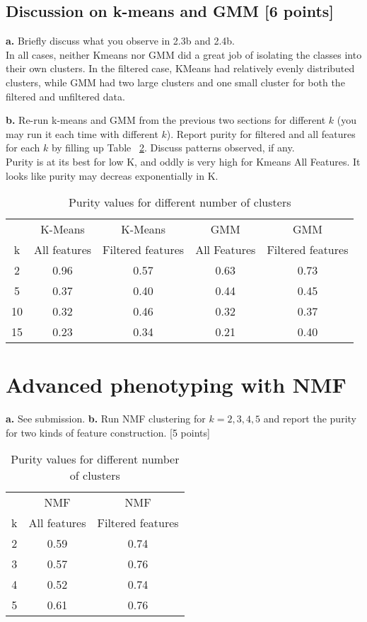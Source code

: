 \documentclass[12pt]{article}
\begin{document}
\subsection{Discussion on k-means and GMM [6 points]}
\textbf{a.} Briefly discuss what you observe in 2.3b and 2.4b.\\

In all cases, neither Kmeans nor GMM did a great job of isolating the classes
into their own clusters.  In the filtered case, KMeans had relatively evenly
distributed clusters, while GMM had two large clusters and one small cluster for
both the filtered and unfiltered data.

\textbf{b.} Re-run k-means and GMM from the previous two sections for different $k$ (you may run it each time with different $k$). Report purity for filtered and all features for each $k$ by filling up Table ~\ref{tbl:kpurity}. Discuss patterns observed, if any.\\

Purity is at its best for low K, and oddly is very high for Kmeans All Features.
It looks like purity may decreas exponentially in K.


\begin{table}[!h]
\centering
\begin{tabular}{ c | c | c | c | c}
  \hline
   & K-Means & K-Means & GMM & GMM\\
  k & All features & Filtered features & All Features & Filtered features \\
  \hline
  2 & 0.96  & 0.57  & 0.63 &  0.73 \\
  5 & 0.37  & 0.40 & 0.44 & 0.45 \\
  10 & 0.32  & 0.46 & 0.32 & 0.37 \\
  15 & 0.23  & 0.34 & 0.21 & 0.40 \\
  \hline
\end{tabular}
\caption{Purity values for different number of clusters}
\label{tbl:kpurity}
\end{table}

\section{Advanced phenotyping with NMF}
\textbf{a.} See submission. \hfill \break
\textbf{b.} Run NMF clustering for $k=2,3,4,5$ and report the purity for two kinds of feature construction. [5 points]
\begin{table}[!h]
\centering
\begin{tabular}{ c | c | c }
  \hline
  & NMF & NMF \\
  k & All features & Filtered features\\
  \hline
  2 & 0.59 & 0.74 \\
  3 & 0.57 & 0.76 \\
  4 & 0.52 & 0.74 \\
  5 & 0.61 & 0.76 \\
  \hline
\end{tabular}
\caption{Purity values for different number of clusters}
\label{tbl:kpurity}
\end{table}
\end{document}
